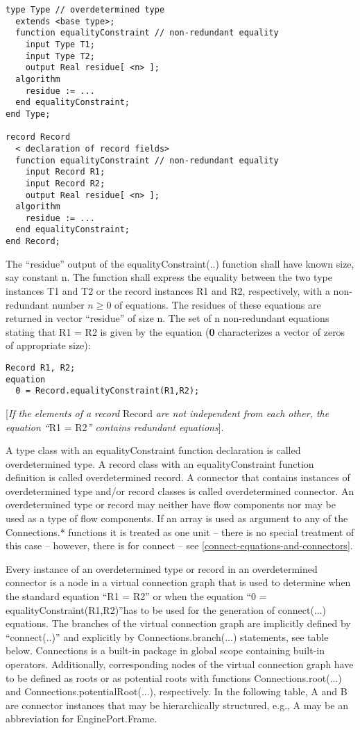 \begin{lstlisting}[language=modelica]
type Type // overdetermined type
  extends <base type>;
  function equalityConstraint // non-redundant equality
    input Type T1;
    input Type T2;
    output Real residue[ <n> ];
  algorithm
    residue := ...
  end equalityConstraint;
end Type;

record Record
  < declaration of record fields>
  function equalityConstraint // non-redundant equality
    input Record R1;
    input Record R2;
    output Real residue[ <n> ];
  algorithm
    residue := ...
  end equalityConstraint;
end Record;
\end{lstlisting}
The ``residue'' output of the equalityConstraint(..) function shall have
known size, say constant n. The function shall express the equality
between the two type instances T1 and T2 or the record instances R1 and
R2, respectively, with a non-redundant number $ n \ge 0$ of equations. The
residues of these equations are returned in vector ``residue'' of size
n. The set of n non-redundant equations stating that R1 = R2 is given by
the equation (\textbf{0} characterizes a vector of zeros of appropriate
size):

\begin{lstlisting}[language=modelica]
  Record R1, R2;
equation
  0 = Record.equalityConstraint(R1,R2);
\end{lstlisting}
{[}\emph{If the elements of a record} Record \emph{are not independent
from each other, the equation ``}R1 = R2\emph{'' contains redundant
equations}{]}.

A type class with an equalityConstraint function declaration is called
overdetermined type. A record class with an equalityConstraint function
definition is called overdetermined record. A connector that contains
instances of overdetermined type and/or record classes is called
overdetermined connector. An overdetermined type or record may neither
have flow components nor may be used as a type of flow components. If an
array is used as argument to any of the Connections.* functions it is
treated as one unit -- there is no special treatment of this case --
however, there is for connect -- see \ref{connect-equations-and-connectors}.

Every instance of an overdetermined type or record in an overdetermined
connector is a node in a virtual connection graph that is used to
determine when the standard equation ``R1 = R2'' or when the equation
``0 = equalityConstraint(R1,R2)''has to be used for the generation of
connect(...) equations. The branches of the virtual connection graph are
implicitly defined by ``connect(..)'' and explicitly by
Connections.branch(...) statements, see table below. Connections is a
built-in package in global scope containing built-in operators.
Additionally, corresponding nodes of the virtual connection graph have
to be defined as roots or as potential roots with functions
Connections.root(...) and Connections.potentialRoot(...), respectively.
In the following table, A and B are connector instances that may be
hierarchically structured, e.g., A may be an abbreviation for
EnginePort.Frame.


